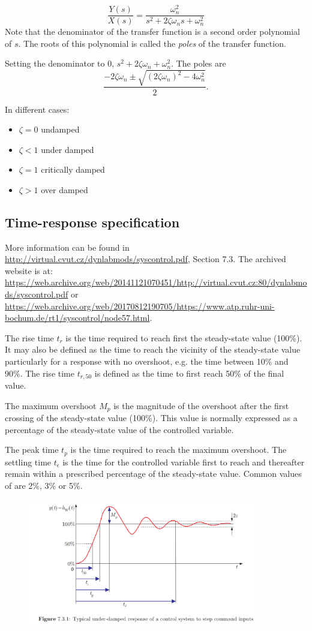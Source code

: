 \documentclass[a4paper,UTF8]{article}
\theoremstyle{mystyle}{
  \newtheorem{law}{Law}
}
\begin{document}
\[
\frac{Y(s)}{X(s)}=\frac{\omega_n^2}{s^2+2 \zeta\omega_n s +\omega_n^2}
\]
Note that the denominator of the transfer function is a second
order polynomial of $s$. The roots of this polynomial is called
the \emph{poles} of the transfer function.

Setting the denominator to 0, $s^2+2 \zeta\omega_n+\omega_n^2$.
The poles are
\[
\frac{-2\zeta\omega_n\pm\sqrt{(2\zeta\omega_n)^2-4\omega_n^2}}{2}.
\]

In different cases:
\begin{itemize}
\item $\zeta=0$  undamped
\item $\zeta<1$  under damped
\item $\zeta=1$  critically damped
\item $\zeta>1$  over damped
\end{itemize}

\subsection{Time-response specification}
{\footnotesize\sffamily
More information can be found in \url{http://virtual.cvut.cz/dynlabmods/syscontrol.pdf}, Section 7.3. The archived website is at: \url{https://web.archive.org/web/20141121070451/http://virtual.cvut.cz:80/dynlabmods/syscontrol.pdf} or \url{https://web.archive.org/web/20170812190705/https://www.atp.ruhr-uni-bochum.de/rt1/syscontrol/node57.html}.
}

The rise time $t_r$ is the time required to reach first the steady-state value (100\%). It may also be defined as the time to reach the vicinity of the steady-state value particularly for a response with no overshoot, e.g. the time between 10\% and 90\%. The  rise time $t_{r,50}$ is defined as the time to first reach 50\% of the final value.

The maximum overshoot $M_p$ is the magnitude of the overshoot after the first crossing of the steady-state value (100\%). This value is normally expressed as a percentage of the steady-state value of the controlled variable.

The peak time $t_p$ is the time required to reach the maximum overshoot.
The settling time $t_{\epsilon}$ is the time for the controlled variable first to reach and thereafter remain within a prescribed percentage  of the steady-state value. Common values of  are 2\%, 3\% or 5\%.
\begin{figure}[htbp]
\centering
\includegraphics[width=0.9\textwidth]{fig/response}
\end{figure}
\end{document}

